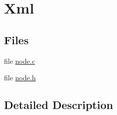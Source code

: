 \hypertarget{group__xml}{\section{Xml}
\label{group__xml}
}
\subsection*{Files}
\begin{DoxyCompactItemize}
\item 
file \hyperlink{node_8c}{node.\-c}
\item 
file \hyperlink{node_8h}{node.\-h}
\end{DoxyCompactItemize}


\subsection{Detailed Description}
